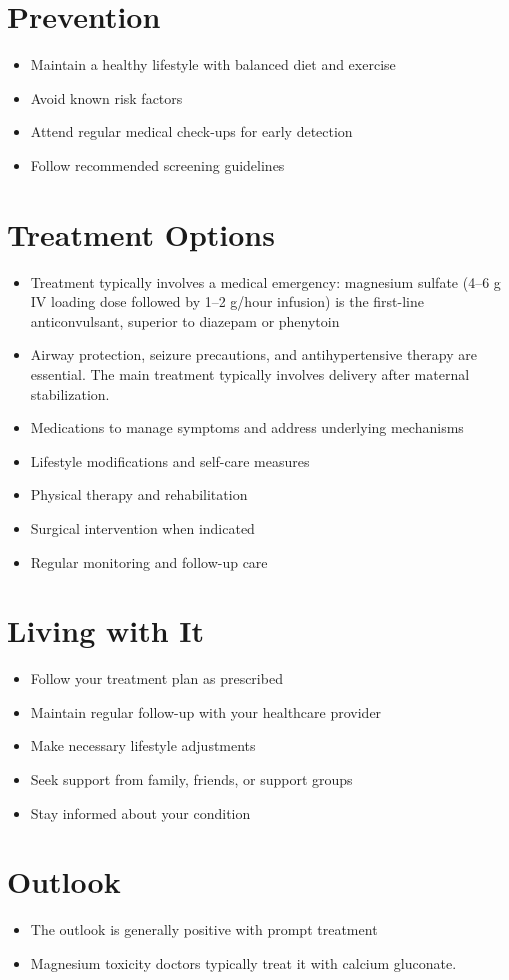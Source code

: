 \section{Prevention}
\begin{itemize}[noitemsep]
  \item Maintain a healthy lifestyle with balanced diet and exercise
  \item Avoid known risk factors
  \item Attend regular medical check-ups for early detection
  \item Follow recommended screening guidelines
\end{itemize}
\section{Treatment Options}
\begin{itemize}[noitemsep]
  \item Treatment typically involves a medical emergency: magnesium sulfate (4--6 g IV loading dose followed by 1--2 g/hour infusion) is the first-line anticonvulsant, superior to diazepam or phenytoin
  \item Airway protection, seizure precautions, and antihypertensive therapy are essential. The main treatment typically involves delivery after maternal stabilization.
  \item Medications to manage symptoms and address underlying mechanisms
  \item Lifestyle modifications and self-care measures
  \item Physical therapy and rehabilitation
  \item Surgical intervention when indicated
  \item Regular monitoring and follow-up care
\end{itemize}
\section{Living with It}
\begin{itemize}[noitemsep]
  \item Follow your treatment plan as prescribed
  \item Maintain regular follow-up with your healthcare provider
  \item Make necessary lifestyle adjustments
  \item Seek support from family, friends, or support groups
  \item Stay informed about your condition
\end{itemize}
\section{Outlook}
\begin{itemize}[noitemsep]
  \item The outlook is generally positive with prompt treatment
  \item Magnesium toxicity doctors typically treat it with calcium gluconate.
\end{itemize}
